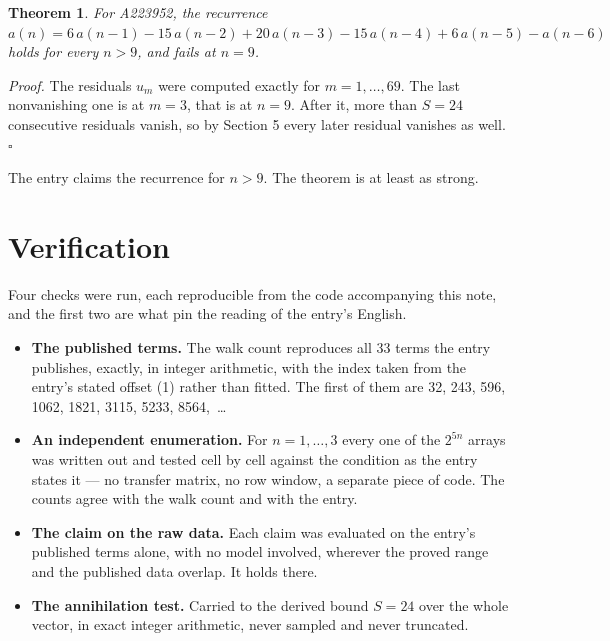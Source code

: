 \documentclass[11pt]{article}
\newtheorem{theorem}{Theorem}
\theoremstyle{definition}
\begin{document}
\begin{theorem} For A223952, the recurrence $a(n) = 6\,a(n-1) - 15\,a(n-2) + 20\,a(n-3) - 15\,a(n-4) + 6\,a(n-5) - a(n-6)$ holds for every $n > 9$, and fails at $n = 9$.\end{theorem}

{\itshape Proof.} The residuals $u_m$ were computed exactly for $m = 1,\dots,69$. The last nonvanishing one is at $m = 3$, that is at $n = 9$. After it, more than $S = 24$ consecutive residuals vanish, so by Section 5 every later residual vanishes as well. $\square$

The entry claims the recurrence for $n > 9$. The theorem is at least as strong.

\section{Verification}

Four checks were run, each reproducible from the code accompanying this note, and the first two are what pin the reading of the entry's English.

\begin{itemize}

\item {\bfseries The published terms.} The walk count reproduces all 33 terms the entry publishes, exactly, in integer arithmetic, with the index taken from the entry's stated offset (1) rather than fitted. The first of them are 32, 243, 596, 1062, 1821, 3115, 5233, 8564,~\dots

\item {\bfseries An independent enumeration.} For $n = 1,\dots,3$ every one of the $2^{5n}$ arrays was written out and tested cell by cell against the condition as the entry states it --- no transfer matrix, no row window, a separate piece of code. The counts agree with the walk count and with the entry.

\item {\bfseries The claim on the raw data.} Each claim was evaluated on the entry's published terms alone, with no model involved, wherever the proved range and the published data overlap. It holds there.

\item {\bfseries The annihilation test.} Carried to the derived bound $S = 24$ over the whole vector, in exact integer arithmetic, never sampled and never truncated.

\end{itemize}
\end{document}
